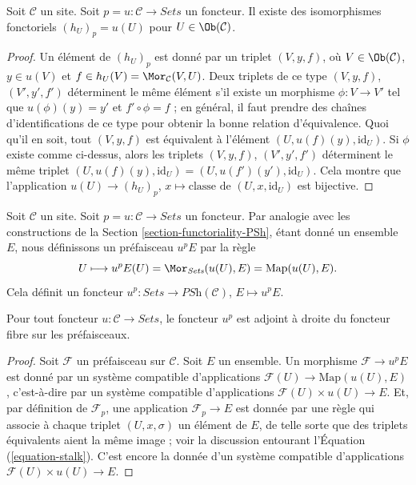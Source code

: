 \begin{lemma}
\label{lemma-points-recover}
Soit $\mathcal{C}$ un site.
Soit $p = u : \mathcal{C} \to \textit{Sets}$ un foncteur.
Il existe des isomorphismes fonctoriels $(h_U)_p = u(U)$ pour
$U \in \Ob(\mathcal{C})$.
\end{lemma}

\begin{proof}
Un élément de $(h_U)_p$ est donné par un triplet $(V, y, f)$, où
$V \in \Ob(\mathcal{C})$, $y\in u(V)$ et
$f \in h_U(V) = \Mor_\mathcal{C}(V, U)$.
Deux triplets de ce type $(V, y, f)$, $(V', y', f')$ déterminent le même
élément s’il existe un morphisme $\phi : V \to V'$ tel que
$u(\phi)(y) = y'$ et $f' \circ \phi = f$ ; en général, il faut prendre des
chaînes d’identifications de ce type pour obtenir la bonne relation
d’équivalence. Quoi qu’il en soit, tout $(V, y, f)$ est équivalent à l’élément
$(U, u(f)(y), \text{id}_U)$. Si $\phi$ existe comme ci-dessus, alors les
triplets $(V, y, f)$, $(V', y', f')$ déterminent le même triplet
$(U, u(f)(y), \text{id}_U) = (U, u(f')(y'), \text{id}_U)$.
Cela montre que l’application
$u(U) \to (h_U)_p$, $x \mapsto \text{classe de }(U, x, \text{id}_U)$
est bijective.
\end{proof}

\noindent
Soit $\mathcal{C}$ un site. Soit
$p = u : \mathcal{C} \to \textit{Sets}$ un foncteur. Par analogie avec les
constructions de la Section \ref{section-functoriality-PSh}, étant donné un
ensemble $E$, nous définissons un préfaisceau $u^pE$ par la règle
\begin{equation}
\label{equation-skyscraper}
U
\longmapsto
u^pE(U) = \Mor_{\textit{Sets}}(u(U), E) = \text{Map}(u(U), E).
\end{equation}
Cela définit un foncteur
$u^p : \textit{Sets} \to \textit{PSh}(\mathcal{C})$, $E \mapsto u^pE$.

\begin{lemma}
\label{lemma-adjoint-point-push-stalk}
Pour tout foncteur $u : \mathcal{C} \to \textit{Sets}$, le foncteur $u^p$ est
adjoint à droite du foncteur fibre sur les préfaisceaux.
\end{lemma}

\begin{proof}
Soit $\mathcal{F}$ un préfaisceau sur $\mathcal{C}$.
Soit $E$ un ensemble. Un morphisme $\mathcal{F} \to u^pE$ est donné par un
système compatible d’applications
$\mathcal{F}(U) \to \text{Map}(u(U), E)$, c’est-à-dire par un système
compatible d’applications $\mathcal{F}(U) \times u(U) \to E$.
Et, par définition de $\mathcal{F}_p$, une application
$\mathcal{F}_p \to E$ est donnée par une règle qui associe à chaque triplet
$(U, x, \sigma)$ un élément de $E$, de telle sorte que des triplets équivalents
aient la même image ; voir la discussion entourant
l’Équation (\ref{equation-stalk}).
C’est encore la donnée d’un système compatible d’applications
$\mathcal{F}(U) \times u(U) \to E$.
\end{proof}


